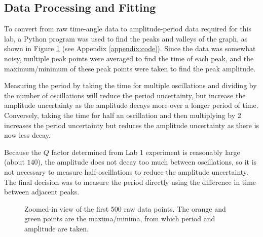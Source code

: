 \documentclass[aps,twocolumn,secnumarabic,nobalancelastpage,amsmath,amssymb,nofootinbib,floatfix]{revtex4}
\begin{document}
\subsection{Data Processing and Fitting}

To convert from raw time-angle data to amplitude-period data required for this lab, a Python program was used to find
the peaks and valleys of the graph, as shown in Figure \ref{fig:rawdata} (see Appendix \ref{appendix:code}).
Since the data was somewhat noisy, multiple peak points were averaged to find the time of each peak, and the
maximum/minimum of these peak points were taken to find the peak amplitude.

Measuring the period by taking the time for multiple oscillations and dividing by the number of oscillations will reduce
the period uncertainty, but increase the amplitude uncertainty as the amplitude decays more over a longer period of
time. Conversely, taking the time for half an oscillation and then multiplying by 2 increases the period uncertainty but
reduces the amplitude uncertainty as there is now less decay.

Because the $Q$ factor determined from Lab 1 experiment is reasonably large (about $140$), the amplitude does not decay
too much between oscillations, so it is not necessary to measure half-oscillations to reduce the amplitude uncertainty.
The final decision was to measure the period directly using the difference in time between adjacent peaks.

\begin{figure}[htb]
    \caption{Zoomed-in view of the first 500 raw data points. The orange and green points are the maxima/minima, from
             which period and amplitude are taken.}
    \label{fig:rawdata}
\end{figure}
\end{document}
